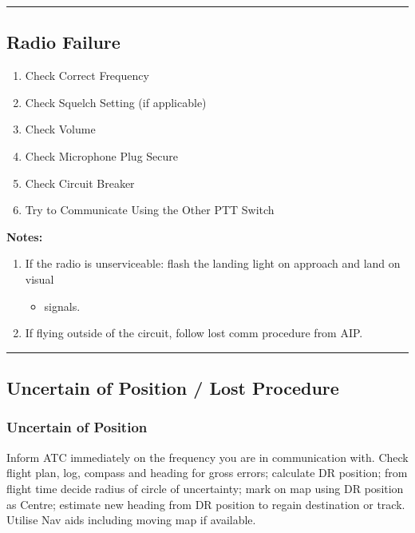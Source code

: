 \documentclass[a4paper]{article}
\newenvironment{checklist}{
  \begin{itemize}[leftmargin=*, align=left]
    \setlength{\itemsep}{2pt}
    \setlength{\parskip}{0pt}
    \setlength{\parsep}{0pt}
}{
  \end{itemize}
}
\newenvironment{numberedchecklist}{
  \begin{enumerate}[label=\arabic*., leftmargin=*, align=left]
    \setlength{\itemsep}{2pt}
    \setlength{\parskip}{0pt}
    \setlength{\parsep}{0pt}
}{
  \end{enumerate}
}
\begin{document}
\rule{\linewidth}{0.4pt}

\subsection*{Radio Failure}
\begin{numberedchecklist}
\item Check Correct Frequency
\item Check Squelch Setting (if applicable)
\item Check Volume
\item Check Microphone Plug Secure
\item Check Circuit Breaker
\item Try to Communicate Using the Other PTT Switch
\end{numberedchecklist}

\textbf{Notes:}
\begin{numberedchecklist}
\item If the radio is unserviceable: flash the landing light on approach and land on visual
  \begin{checklist}
  \item signals.
  \end{checklist}
\item If flying outside of the circuit, follow lost comm procedure from AIP.
\end{numberedchecklist}

\rule{\linewidth}{0.4pt}

\subsection*{Uncertain of Position / Lost Procedure}

\subsubsection*{Uncertain of Position}
Inform ATC immediately on the frequency you are in communication with.
Check flight plan, log, compass and heading for gross errors; calculate DR position; from
flight time decide radius of circle of uncertainty; mark on map using DR position as Centre;
estimate new heading from DR position to regain destination or track. Utilise Nav aids
including moving map if available.
\end{document}
